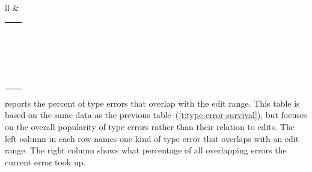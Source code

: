 \documentclass[english,submission,cleveref]{programming}
\begin{document}
\begin{table}[t]
\begin{tabular}{ll}
        &
    \begin{tabular}[t]{l@{~}r}
      \code{UnknownSymbol} & \pct{23.97} \\
      \code{TypeMismatch} & \pct{20.46} \\
      \code{UnknownProperty} & \pct{18.88} \\
      \code{SyntaxError} & \pct{9.31} \\
      \code{CannotInferBinaryOperation} & \pct{6.94} \\
      \code{MissingProperties} & \pct{4.04} \\
      \code{CountMismatch} & \pct{2.99} \\
      \code{OptionalValueAccess} & \pct{2.99} \\
      \code{FunctionExitsWithoutReturn} & \pct{2.99} \\
      \code{UnknownRequire} & \pct{2.37} \\
      \code{GenericError} & \pct{2.28} \\
      \code{NotATable} & \pct{1.32} \\
      \code{GenericExtraInformation} & \pct{0.35} \\
      \code{UnknownPropButGotLikeProp} & \pct{0.26} \\
      \code{IncorrectGenericParamCount} & \pct{0.18} \\
      \code{CannotCallNonFunction} & \pct{0.18} \\
      \code{IllegalRequire} & \pct{0.18} \\
      \code{ModuleHasCyclicDependency} & \pct{0.09} \\
      \code{CannotExtendTable} & \pct{0.09} \\
      \code{OccursCheckFailed} & \pct{0.09} \\
      \code{TypesAreUnrelated} & \pct{0.09} \\
    \end{tabular}
  \end{tabular}
\end{table}

 reports the percent of
type errors that overlap with the edit range.
This table is based on the same data as the previous table~(\cref{t:type-error-survival}),
but focuses on the overall popularity of type errors
rather than their relation to edits.
The left column in each row names one kind of type error
that overlaps with an edit range.
The right column shows what percentage of all overlapping
errors the current error took up.
\end{document}
